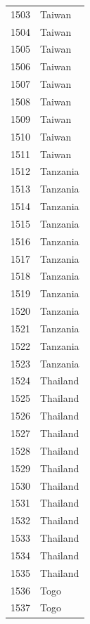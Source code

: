 \documentclass[
  letterpaper,
  DIV=11,
  numbers=noendperiod]{scrreprt}
\begin{document}
\begin{tabular}{ll}
1503 &                    Taiwan \\
1504 &                    Taiwan \\
1505 &                    Taiwan \\
1506 &                    Taiwan \\
1507 &                    Taiwan \\
1508 &                    Taiwan \\
1509 &                    Taiwan \\
1510 &                    Taiwan \\
1511 &                    Taiwan \\
1512 &                  Tanzania \\
1513 &                  Tanzania \\
1514 &                  Tanzania \\
1515 &                  Tanzania \\
1516 &                  Tanzania \\
1517 &                  Tanzania \\
1518 &                  Tanzania \\
1519 &                  Tanzania \\
1520 &                  Tanzania \\
1521 &                  Tanzania \\
1522 &                  Tanzania \\
1523 &                  Tanzania \\
1524 &                  Thailand \\
1525 &                  Thailand \\
1526 &                  Thailand \\
1527 &                  Thailand \\
1528 &                  Thailand \\
1529 &                  Thailand \\
1530 &                  Thailand \\
1531 &                  Thailand \\
1532 &                  Thailand \\
1533 &                  Thailand \\
1534 &                  Thailand \\
1535 &                  Thailand \\
1536 &                      Togo \\
1537 &                      Togo \\

\end{tabular}
\end{document}
